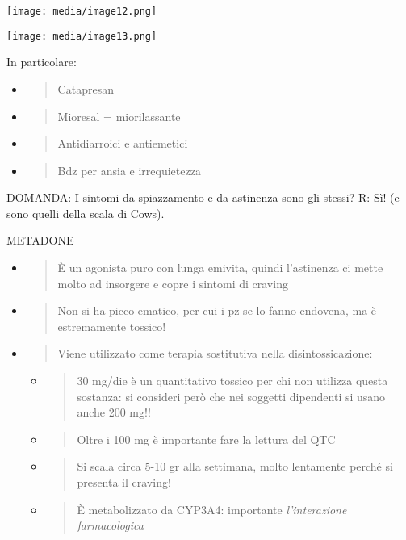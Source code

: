 \documentclass[]{article}
\begin{document}
\texttt{[image: media/image12.png]}

\texttt{[image: media/image13.png]}

In particolare:

\begin{itemize}
\item
  \begin{quote}
  Catapresan
  \end{quote}
\item
  \begin{quote}
  Mioresal = miorilassante
  \end{quote}
\item
  \begin{quote}
  Antidiarroici e antiemetici
  \end{quote}
\item
  \begin{quote}
  Bdz per ansia e irrequietezza
  \end{quote}
\end{itemize}

DOMANDA: I sintomi da spiazzamento e da astinenza sono gli stessi? R:
Sì! (e sono quelli della scala di Cows).

METADONE

\begin{itemize}
\item
  \begin{quote}
  È un agonista puro con lunga emivita, quindi l'astinenza ci mette
  molto ad insorgere e copre i sintomi di craving
  \end{quote}
\item
  \begin{quote}
  Non si ha picco ematico, per cui i pz se lo fanno endovena, ma è
  estremamente tossico!
  \end{quote}
\item
  \begin{quote}
  Viene utilizzato come terapia sostitutiva nella disintossicazione:
  \end{quote}

  \begin{itemize}
  \item
    \begin{quote}
    30 mg/die è un quantitativo tossico per chi non utilizza questa
    sostanza: si consideri però che nei soggetti dipendenti si usano
    anche 200 mg!!
    \end{quote}
  \item
    \begin{quote}
    Oltre i 100 mg è importante fare la lettura del QTC
    \end{quote}
  \item
    \begin{quote}
    Si scala circa 5-10 gr alla settimana, molto lentamente perché si
    presenta il craving!
    \end{quote}
  \item
    \begin{quote}
    È metabolizzato da CYP3A4: importante \emph{l'interazione
    farmacologica}
    \end{quote}
  \end{itemize}
\end{itemize}
\end{document}

